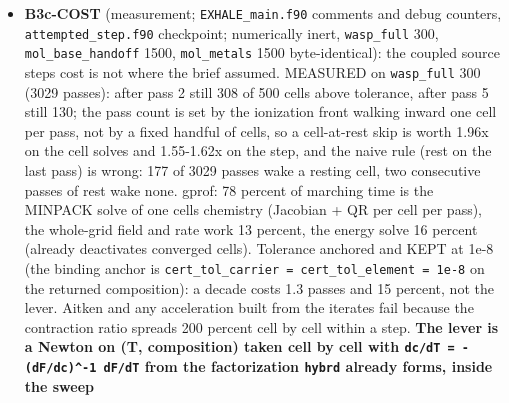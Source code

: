 \documentclass[english,a4paper]{my_memo}
\begin{document}
\begin{itemize}
  ALSO FIXED, a defect of my own file found outside the task: the run\textquotesingle s cost
  line divided passes accumulated over every ENTRY of the coupled loop by the
  number of adopted STEPS, two different populations, so it could report a
  mean above the worst single entry (MEASURED on the control, \texttt{wasp\_full} 300
  in \texttt{phys} mode: "13.98 passes per step on average, worst 11"). It now
  divides by the entries and names them. ALSO: \texttt{heat\_channel\_state} is in the
  attempted-step checkpoint (save/restore/compare/perturb), the four lines
  HEATBRK\textquotesingle s report asked for, with two assertions RED on the control (the
  moved array is not seen, and the restore leaves it 3.0 off). Tests:
  \texttt{coupled\_source\_step} 36/0 (33 before), \texttt{attempted\_step} 97/0 (95 before).
  Impact, control = the same tree snapshot with this item\textquotesingle s two production
  files reverted: \texttt{wasp\_full} 300, \texttt{mol\_base\_handoff} 1500 and \texttt{mol\_metals}
  1500 all \textbf{byte-identical} in \texttt{Hydro\_ioniz.txt} and \texttt{Ion\_species.txt}.
\item
  \textbf{B3c-COST} (measurement; \texttt{EXHALE\_main.f90} comments and debug counters,
  \texttt{attempted\_step.f90} checkpoint; numerically inert, \texttt{wasp\_full} 300,
  \texttt{mol\_base\_handoff} 1500, \texttt{mol\_metals} 1500 byte-identical): the coupled
  source step\textquotesingle s cost is not where the brief assumed. MEASURED on \texttt{wasp\_full}
  300 (3029 passes): after pass 2 still 308 of 500 cells above tolerance,
  after pass 5 still 130; the pass count is set by the ionization front
  walking inward one cell per pass, not by a fixed handful of cells, so a
  cell-at-rest skip is worth 1.96x on the cell solves and 1.55-1.62x on the
  step, and the naive rule (rest on the last pass) is wrong: 177 of 3029
  passes wake a resting cell, two consecutive passes of rest wake none.
  gprof: 78 percent of marching time is the MINPACK solve of one cell\textquotesingle s
  chemistry (Jacobian + QR per cell per pass), the whole-grid field and
  rate work 13 percent, the energy solve 16 percent (already deactivates
  converged cells). Tolerance anchored and KEPT at 1e-8 (the binding anchor
  is \texttt{cert\_tol\_carrier\ =\ cert\_tol\_element\ =\ 1e-8} on the returned
  composition): a decade costs 1.3 passes and 15 percent, not the lever.
  Aitken and any acceleration built from the iterates fail because the
  contraction ratio spreads 200 percent cell by cell within a step. \textbf{The
  lever is a Newton on (T, composition) taken cell by cell with \texttt{dc/dT\ =\ -(dF/dc)\^{}-1\ dF/dT} from the factorization \texttt{hybrd} already forms, inside the sweep
}
\end{itemize}
\end{document}
